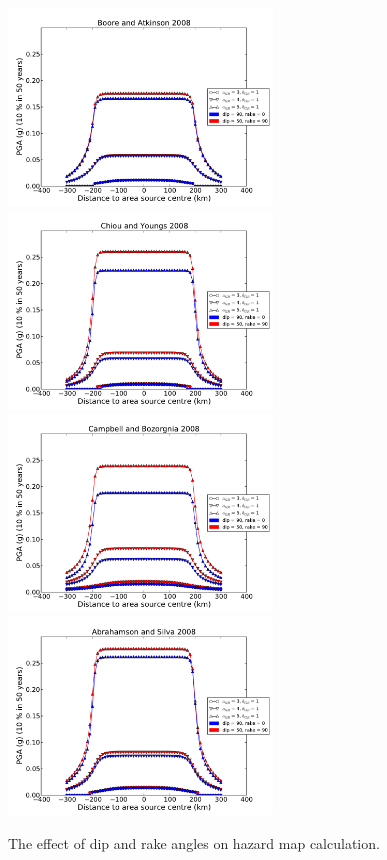 \begin{figure}
\centering
\includegraphics[width=7cm]{./Pictures/PGA_0pt1_BA2008_dip_rake.pdf}
\includegraphics[width=7cm]{./Pictures/PGA_0pt1_CY2008_dip_rake.pdf}
\includegraphics[width=7cm]{./Pictures/PGA_0pt1_CB2008_dip_rake.pdf}
\includegraphics[width=7cm]{./Pictures/PGA_0pt1_AS2008_dip_rake.pdf}
\caption{The effect of dip and rake angles on hazard map calculation.}
\label{fig:dip_rake_area}
\end{figure}

